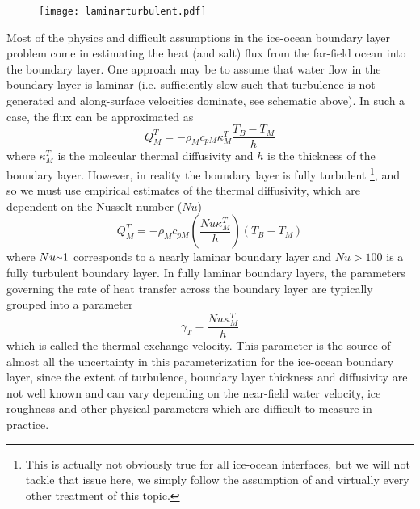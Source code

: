 \documentclass[12pt]{article}
\theoremstyle{definition}
\newcommand{\mytilde}{\raise.17ex\hbox{$\scriptstyle\mathtt{\sim}$}}
\begin{document}
\begin{figure}[h]
  \begin{center}
\texttt{[image: laminarturbulent.pdf]}
  \end{center}
\end{figure}

Most of the physics and difficult assumptions in the ice-ocean boundary layer problem come in estimating the heat (and salt) flux from the far-field ocean into the boundary layer. One approach may be to assume that water flow in the boundary layer is laminar (i.e. sufficiently slow such that turbulence is not generated and along-surface velocities dominate, see schematic above). In such a case, the flux can be approximated as
\begin{equation} Q_M^T = - \rho_M c_{pM} \kappa _M^T \frac{T_B-T_M}{h} \end{equation}
where $\kappa _M^T$ is the molecular thermal diffusivity and $h$ is the thickness of the boundary layer. However, in reality the boundary layer is fully turbulent \footnote{This is actually not obviously true for all ice-ocean interfaces, but we will not tackle that issue here, we simply follow the assumption of \cite{hollandj1999:meltparam} and virtually every other treatment of this topic.}, and so we must use empirical estimates of the thermal diffusivity, which are dependent on the Nusselt number ($Nu$)
\begin{equation} \label{eq:turbBLf} Q_M^T = - \rho_M c_{pM} \left( \frac{Nu \kappa _M^T}{h} \right) \left(T_B-T_M \right) \end{equation}
where $Nu \mytilde 1$ corresponds to a nearly laminar boundary layer and $Nu > 100$ is a fully turbulent boundary layer. In fully laminar boundary layers, the parameters governing the rate of heat transfer across the boundary layer are typically grouped into a parameter
\begin{equation}
\gamma_T = \frac{Nu \kappa_M^T}{h}
\end{equation}
which is called the thermal exchange velocity. This parameter is the source of almost all the uncertainty in this parameterization for the ice-ocean boundary layer, since the extent of turbulence, boundary layer thickness and diffusivity are not well known and can vary depending on the near-field water velocity, ice roughness and other physical parameters which are difficult to measure in practice.
\end{document}
